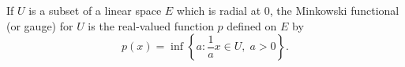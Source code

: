 If $U$ is a subset of a linear space $E$ which is radial at $0$, the Minkowski functional (or gauge) for $U$ is the real-valued function $p$ defined on $E$ by
$$
p(x) = \inf\left\{a : \frac{1}{a}x \in U,\; a > 0\right\}.
$$
